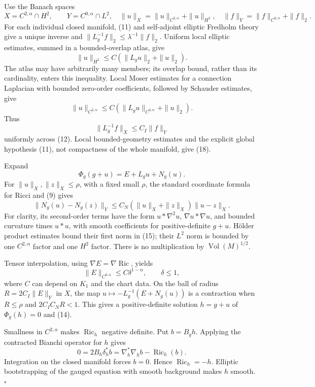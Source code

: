 \documentclass[
  11pt,
]{article}
\begin{document}
Use the Banach spaces \[
 X=C^{2,\alpha}\cap H^2,\qquad Y=C^{0,\alpha}\cap L^2,
 \quad \|u\|_X=\|u\|_{C^{2,\alpha}}+\|u\|_{H^2},
 \quad \|f\|_Y=\|f\|_{C^{0,\alpha}}+\|f\|_2.                   \tag{15}
\] For each individual closed manifold, (11) and self-adjoint elliptic
Fredholm theory give a unique inverse and
\(\|L_g^{-1}f\|_2\le\lambda^{-1}\|f\|_2\). Uniform local elliptic
estimates, summed in a bounded-overlap atlas, give \[
 \|u\|_{H^2}\le C(\|L_gu\|_2+\|u\|_2).                      \tag{16}
\] The atlas may have arbitrarily many members; its overlap bound,
rather than its cardinality, enters this inequality. Local Moser
estimates for a connection Laplacian with bounded zero-order
coefficients, followed by Schauder estimates, give \[
 \|u\|_{C^{2,\alpha}}
       \le C(\|L_gu\|_{C^{0,\alpha}}+\|u\|_2).                \tag{17}
\] Thus \[
                         \|L_g^{-1}f\|_X\le C_I\|f\|_Y       \tag{18}
\] uniformly across (12). Local bounded-geometry estimates and the
explicit global hypothesis (11), not compactness of the whole manifold,
give (18).

Expand \[
 \Phi_g(g+u)=E+L_gu+N_g(u).
\] For \(\|u\|_X,\|z\|_X\le\rho\), with a fixed small \(\rho\), the
standard coordinate formula for Ricci and (9) gives \[
 \|N_g(u)-N_g(z)\|_Y
     \le C_N(\|u\|_X+\|z\|_X)\|u-z\|_X.                    \tag{19}
\] For clarity, its second-order terms have the form \(u*\nabla^2u\),
\(\nabla u*\nabla u\), and bounded curvature times \(u*u\), with smooth
coefficients for positive-definite \(g+u\). Hölder product estimates
bound their first norm in (15); their \(L^2\) norm is bounded by one
\(C^{2,\alpha}\) factor and one \(H^2\) factor. There is no
multiplication by \(\operatorname{Vol}(M)^{1/2}\).

Tensor interpolation, using \(\nabla E=\nabla\operatorname{Ric}\),
yields \[
 \|E\|_{C^{0,\alpha}}\le C\delta^{1-\alpha},\qquad \delta\le1,
                                                                  \tag{20}
\] where \(C\) can depend on \(K_1\) and the chart data. On the ball of
radius \(R=2C_I\|E\|_Y\) in \(X\), the map
\(u\mapsto-L_g^{-1}(E+N_g(u))\) is a contraction when \(R\le\rho\) and
\(2C_IC_NR<1\). This gives a positive-definite solution \(h=g+u\) of
\(\Phi_g(h)=0\) and (14).

Smallness in \(C^{2,\alpha}\) makes \(\operatorname{Ric}_h\) negative
definite. Put \(b=B_gh\). Applying the contracted Bianchi operator for
\(h\) gives \[
 0=2B_h\delta_h^*b=\nabla_h^*\nabla_h b-\operatorname{Ric}_h(b).
\] Integration on the closed manifold forces \(b=0\). Hence
\(\operatorname{Ric}_h=-h\). Elliptic bootstrapping of the gauged
equation with smooth background makes \(h\) smooth. \(\square\)
\end{document}
